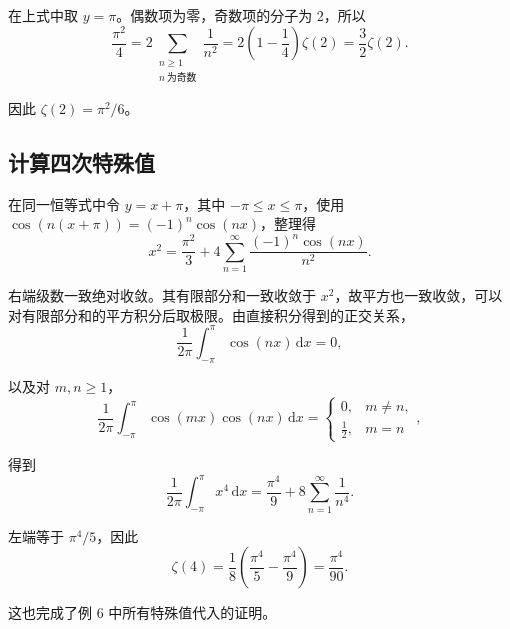 \documentclass[11pt,a4paper]{article}
\begin{document}
在上式中取 \(y=\pi\)。偶数项为零，奇数项的分子为 \(2\)，所以
\[
\frac{\pi^2}{4}
=2\sum_{\substack{n\geqslant1\\n\ \text{为奇数}}}\frac1{n^2}
=2\left(1-\frac14\right)\zeta(2)
=\frac32\zeta(2).
\]

因此 \(\zeta(2)=\pi^2/6\)。

\hypertarget{sec-11-3}{%
\subsection{计算四次特殊值}\label{sec-11-3}}

在同一恒等式中令 \(y=x+\pi\)，其中 \(-\pi\leqslant x\leqslant\pi\)，使用 \(\cos(n(x+\pi))=(-1)^n\cos(nx)\)，整理得
\[
x^2=\frac{\pi^2}{3}
+4\sum_{n=1}^{\infty}\frac{(-1)^n\cos(nx)}{n^2}.
\]

右端级数一致绝对收敛。其有限部分和一致收敛于 \(x^2\)，故平方也一致收敛，可以对有限部分和的平方积分后取极限。由直接积分得到的正交关系，
\[
\frac1{2\pi}\int_{-\pi}^{\pi}\cos(nx)\,\mathrm dx=0,
\]

以及对 \(m,n\geqslant1\)，
\[
\frac1{2\pi}\int_{-\pi}^{\pi}\cos(mx)\cos(nx)\,\mathrm dx
=\begin{cases}
0,&m\ne n,\\
\tfrac12,&m=n
\end{cases},
\]

得到
\[
\frac1{2\pi}\int_{-\pi}^{\pi}x^4\,\mathrm dx
=\frac{\pi^4}{9}+8\sum_{n=1}^{\infty}\frac1{n^4}.
\]

左端等于 \(\pi^4/5\)，因此
\[
\zeta(4)=\frac18\left(\frac{\pi^4}{5}-\frac{\pi^4}{9}\right)
=\frac{\pi^4}{90}.
\]

这也完成了例 6 中所有特殊值代入的证明。
\end{document}

